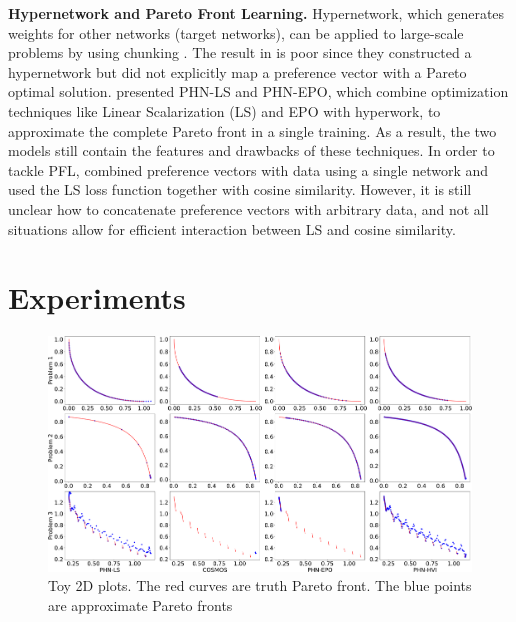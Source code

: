 \documentclass[letterpaper]{article} %
\begin{document}
\indent \textbf{Hypernetwork and Pareto Front Learning.} Hypernetwork, which generates weights for other networks (target networks), can be applied to large-scale problems by using chunking \cite{hyper_origin}. The result in \cite{controllable} is poor since they constructed a hypernetwork but did not explicitly map a preference vector with a Pareto optimal solution. \cite{navon2021learning} presented PHN-LS and PHN-EPO, which combine optimization techniques like Linear Scalarization (LS) and EPO \cite{pmlr-v119-mahapatra20a} with hyperwork, to approximate the complete Pareto front in a single training. As a result, the two models still contain the features and drawbacks of these techniques.  In order to tackle PFL, \cite{ruchte2021scalable} combined preference vectors with data using a single network and used the LS loss function together with cosine similarity. However, it is still unclear how to concatenate preference vectors with arbitrary data, and not all situations allow for efficient interaction between LS and cosine similarity.

\section{Experiments}
\label{st:5}
\begin{figure}
    \centering
    \includegraphics[width=\textwidth]{figures/Toy_Plots.pdf}
    \caption{Toy 2D plots. The red curves are truth Pareto front. The blue points are approximate Pareto fronts}
\end{figure}
\end{document}
